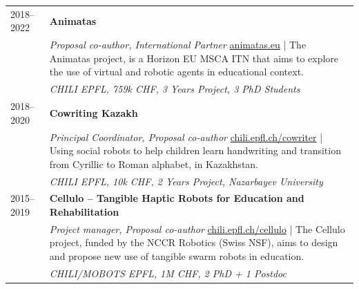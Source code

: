 \begin{tabularx}{\textwidth}{@{}lX@{}}
2018--2022 & \textbf{Animatas} \\
           & \emph{Proposal co-author, International Partner} \quad \href{http://animatas.eu}{animatas.eu} | The Animatas project, is a Horizon EU MSCA ITN that aims to explore the use of virtual and robotic agents in educational context. \\
           & \textit{CHILI EPFL, 759k CHF, 3 Years Project, 3 PhD Students} \\[3pt]

2018--2020 & \textbf{Cowriting Kazakh} \\
           & \emph{Principal Coordinator, Proposal co-author} \quad \href{https://chili.epfl.ch/cowriter}{chili.epfl.ch/cowriter} | Using social robots to help children learn handwriting and transition from Cyrillic to Roman alphabet, in Kazakhstan. \\
           & \textit{CHILI EPFL, 10k CHF, 2 Years Project, Nazarbayev University} \\[3pt]

2015--2019 & \textbf{Cellulo -- Tangible Haptic Robots for Education and Rehabilitation} \\
           & \emph{Project manager, Proposal co-author} \quad \href{http://chili.epfl.ch/cellulo}{chili.epfl.ch/cellulo} | The Cellulo project, funded by the NCCR Robotics (Swiss NSF), aims to design and propose new use of tangible swarm robots in education. \\
           & \textit{CHILI/MOBOTS EPFL, 1M CHF, 2 PhD + 1 Postdoc} \\
\end{tabularx}

